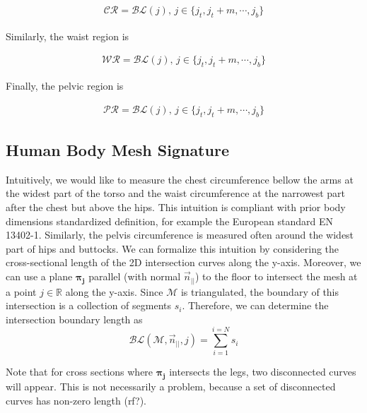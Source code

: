 \documentclass[runningheads, orivec]{llncs}
\begin{document}
\begin{align}
\mathcal{CR} = \mathcal{BL}(j), \, j \in \{j_t, j_t+m, \cdots, j_b\}
\end{align}

Similarly, the waist region is

\begin{align}
\mathcal{WR} = \mathcal{BL}(j), \, j \in \{j_t, j_t+m, \cdots, j_b\}
\end{align}

Finally, the pelvic region is

\begin{align}
\mathcal{PR} = \mathcal{BL}(j), \, j \in \{j_t, j_t+m, \cdots, j_b\}
\end{align}

\subsection{Human Body Mesh Signature}\label{subsec:hbm_signature}
Intuitively, we would like to measure the chest circumference bellow the arms 
at the widest part of the torso and the waist circumference at the 
narrowest part after the chest but above the hips. This intuition is compliant 
with prior body dimensions standardized definition, for example the European 
standard EN 13402-1. Similarly, the pelvis 
circumference is measured often around the widest part of hips and 
buttocks. We 
can formalize this intuition by considering the cross-sectional length of the 
2D intersection curves\cite{book.compu.topo} along the y-axis. Moreover, we 
can 
use a plane $\boldsymbol{\pi_j}$ parallel (with normal $\vec{n}_{||}$) to the 
floor to intersect the mesh at a point $j \in 
\mathbb{R}$ along the y-axis. Since $\mathcal{M}$ is triangulated, the boundary 
of this 
intersection is a collection of segments $s_i$. Therefore, we can 
determine the intersection boundary length as
\begin{equation}
\mathcal{BL}(\mathcal{M}, \vec{n}_{||}, j) = \sum_{i = 
	1}^{i = N}s_i
\end{equation}

Note that for cross sections where $\boldsymbol{\pi_j}$ intersects the legs, 
two 
disconnected curves will appear. This is not necessarily a problem, because a 
set of disconnected curves has non-zero length (rf?).
\end{document}
